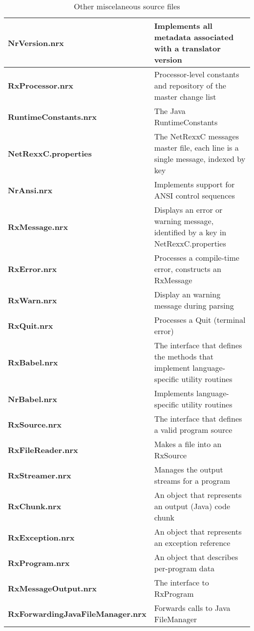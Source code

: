 \begin{table}\caption{Other miscelaneous source files}
\begin{tabularx}{\textwidth}{>{\bfseries}lX}
    \toprule
    NrVersion.nrx       &Implements all metadata associated with a  \nr{} translator version
    \\\midrule
    RxProcessor.nrx     &Processor-level constants and repository of the master change list
    \\\midrule
    RuntimeConstants.nrx    &The Java RuntimeConstants
    \\\midrule
    NetRexxC.properties &The NetRexxC messages master file, each line is a single message, indexed by key
    \\\midrule
    NrAnsi.nrx          &Implements support for ANSI control sequences
    \\\midrule
    RxMessage.nrx       &Displays an error or warning message, identified by a key in NetRexxC.properties
    \\\midrule
    RxError.nrx         &Processes a compile-time error, constructs an RxMessage
    \\\midrule
    RxWarn.nrx          &Display an warning message during parsing
    \\\midrule
    RxQuit.nrx          &Processes a Quit (terminal error)
    \\\midrule
    RxBabel.nrx         &The interface that defines the methods that implement language-specific utility routines
    \\\midrule
    NrBabel.nrx         &Implements language-specific utility routines
    \\\midrule
    RxSource.nrx        &The interface that defines a valid program source
    \\\midrule
    RxFileReader.nrx    &Makes a file into an RxSource
    \\\midrule
    RxStreamer.nrx      &Manages the output streams for a program
    \\\midrule
    RxChunk.nrx         &An object that represents an output (Java) code chunk
    \\\midrule
    RxException.nrx     &An object that represents an exception reference
    \\\midrule
    RxProgram.nrx       &An object that describes per-program data
    \\\midrule
    RxMessageOutput.nrx &The interface to RxProgram
    \\\midrule
    RxForwardingJavaFileManager.nrx &Forwards calls to Java FileManager

\end{tabularx}
\end{table}
